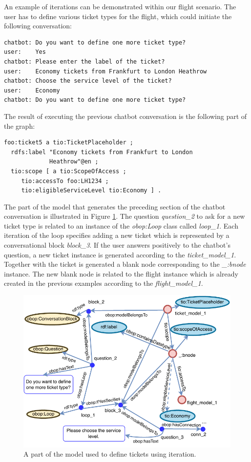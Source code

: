 \documentclass[runningheads]{llncs}
\begin{document}
An example of iterations can be demonstrated within our flight scenario. The user has to define various ticket types for the flight, which could initiate the following conversation:
\begin{lstlisting}[basicstyle=\small,  xleftmargin=0.7cm ]
chatbot: Do you want to define one more ticket type?
user:    Yes
chatbot: Please enter the label of the ticket?
user:    Economy tickets from Frankfurt to London Heathrow
chatbot: Choose the service level of the ticket?
user:    Economy
chatbot: Do you want to define one more ticket type?
\end{lstlisting}
The result of executing the previous chatbot conversation is the following part of the graph:
\begin{lstlisting}[basicstyle=\small,  xleftmargin=0.7cm ]
foo:ticket5 a tio:TicketPlaceholder ;
  rdfs:label "Economy tickets from Frankfurt to London
             Heathrow"@en ;
  tio:scope [ a tio:ScopeOfAccess ;
     tio:accessTo foo:LH1234 ;
     tio:eligibleServiceLevel tio:Economy ] .
\end{lstlisting}
The part of the model that generates the preceding section of the chatbot conversation is illustrated in Figure \ref{fig:iteration_example}. The question \textit{question\_2} to ask for a new ticket type is related to an instance of the \textit{obop:Loop} class called \textit{loop\_1}. Each iteration of the loop specifies adding a new ticket which is represented by a conversational block \textit{block\_3}. If the user answers positively to the chatbot's question, a new ticket instance is generated according to the \textit{ticket\_model\_1}. Together with the ticket is generated a blank node corresponding to the \textit{\_:bnode} instance. The new blank node is related to the flight instance which is already created in the previous examples according to the \textit{flight\_model\_1}.
\begin{figure}[H]
  \centering
  \includegraphics[width=\linewidth]{img/iteration_example}
  \caption{A part of the model used to define tickets using iteration.}
  \label{fig:iteration_example}
\end{figure}
\end{document}
